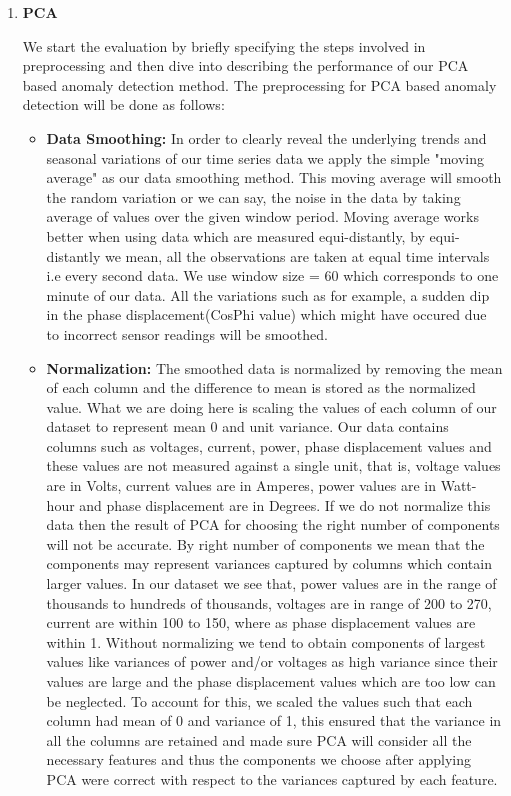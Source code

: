 \begin{enumerate}
\item\textbf{PCA}

We start the evaluation by briefly specifying the steps involved in preprocessing and then dive into describing the performance of our PCA based anomaly detection method. The preprocessing for PCA based anomaly detection will be done as follows:
\begin{itemize}
\item\textbf{Data Smoothing:} In order to clearly reveal the underlying trends and seasonal variations of our time series data we apply the simple "moving average" as our data smoothing method. This moving average will smooth the random variation or we can say, the noise in the data by taking average of values over the given window period. Moving average works better when using data which are measured equi-distantly, by equi-distantly we mean, all the observations are taken at equal time intervals i.e every second data. We use window size = 60 which corresponds to one minute of our data. All the variations such as for example, a sudden dip in the phase displacement(CosPhi value) which might have occured due to incorrect sensor readings will be smoothed.
\item\textbf{Normalization:} The smoothed data is normalized by removing the mean of each column and the difference to mean is stored as the normalized value. What we are doing here is scaling the values of each column of our dataset to represent mean 0 and unit variance. Our data contains columns such as voltages, current, power, phase displacement values and these values are not measured against a single unit, that is, voltage values are in Volts, current values are in Amperes, power values are in Watt-hour and phase displacement are in Degrees. If we do not normalize this data then the result of PCA for choosing the right number of components will not be accurate. By right number of components we mean that the components may represent variances captured by columns which contain larger values. In our dataset we see that, power values are in the range of thousands to hundreds of thousands, voltages are in range of 200 to 270, current are within 100 to 150, where as phase displacement values are within 1. Without normalizing we tend to obtain components of largest values like variances of  power and/or voltages  as high variance since their values are large and the phase displacement values which are too low can be neglected. To account for this, we scaled the values such that each column had mean of 0 and variance of 1, this ensured that the variance in all the columns are retained and made sure PCA will consider all the necessary features and thus the components we choose after applying PCA were correct with respect to the variances captured by each feature.

\end{itemize}
\end{enumerate}
